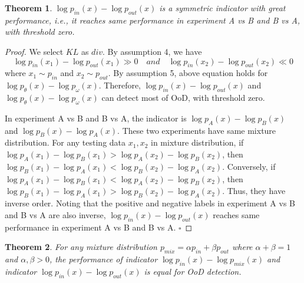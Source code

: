 \documentclass[a3paper]{article}
\newtheorem{theorem}{Theorem}
\newtheorem*{proof}{\it{Proof.}\rm}
\newcommand{\IE}{\textit{i.e.}, }
\newcommand{\pin}{p_{in}}
\newcommand{\pout}{p_{out}}
\newcommand{\pmix}{p_{mix}}
\newcommand*{\QED}{\hfill\ensuremath{\square}}  %
\begin{document}
\begin{theorem}
	\label{thm1}
	$\log \pin(x) - \log \pout(x)$ is a symmetric indicator with great performance, \IE it reaches same performance in experiment A vs B and B vs A, with threshold zero.
\end{theorem}

\begin{proof}\rm
	We select $KL$ as $div$. By assumption 4, we have
	\begin{equation*}
		\log \pin(x_1) - \log \pout(x_1) \gg 0 \quad and \quad \log \pin(x_2) - \log \pout(x_2) \ll 0 
	\end{equation*}
	where $x_1 \sim \pin$ and $x_2 \sim \pout$. By assumption 5, above equation holds for $\log p_\theta(x) - \log p_\omega(x)$. Therefore, $\log \pin(x) - \log \pout(x)$ and $\log p_\theta(x) - \log p_\omega(x)$ can detect most of OoD, with threshold zero. 
	
	In experiment A vs B and B vs A, the indicator is $\log p_A(x) - \log p_B(x)$ and $\log p_B(x) - \log p_A(x)$. These two experiments have same mixture distribution. For any testing data $x_1, x_2$ in mixture distribution, if $\log p_A(x_1) - \log p_B(x_1) > \log p_A(x_2) - \log p_B(x_2)$, then $\log p_B(x_1) - \log p_A(x_1) < \log p_B(x_2) - \log p_A(x_2)$. Conversely, if $\log p_A(x_1) - \log p_B(x_1) < \log p_A(x_2) - \log p_B(x_2)$, then $\log p_B(x_1) - \log p_A(x_1) > \log p_B(x_2) - \log p_A(x_2)$. Thus, they have inverse order. 
	Noting that the positive and negative labels in experiment A vs B and B vs A are also inverse, $\log \pin(x) - \log \pout(x)$ reaches same performance in experiment A vs B and B vs A. \QED
\end{proof}

\begin{theorem}\label{thm2}
	For any mixture distribution $\pmix = \alpha \pin + \beta \pout$ where $\alpha + \beta = 1$ and $\alpha, \beta > 0$, the performance of indicator $\log \pin(x) - \log \pmix(x)$ and indicator $\log \pin(x) - \log \pout(x)$ is equal for OoD detection. 
\end{theorem}
\end{document}
